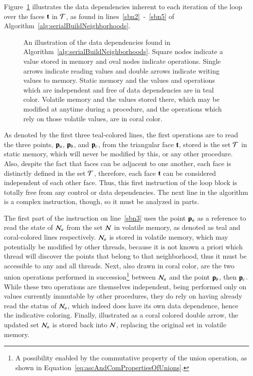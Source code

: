 Figure~\ref{fig:sabnDataDependencies} illustrates the data dependencies inherent to each iteration of the loop over the faces $\mathbf{t}$ in $\mathcal{T}$, as found in lines~\ref{sbn2}~-~\ref{sbn5} of Algorithm~\ref{alg:serialBuildNeighborhoods}.


\begin{figure}[ht]
	
	\caption[Data Dependencies in Serial Algorithm~\ref{alg:serialBuildNeighborhoods}: Build Neighborhoods]{An illustration of the data dependencies found in Algorithm~\ref{alg:serialBuildNeighborhoods}. Square nodes indicate a value stored in memory and oval nodes indicate operations. Single arrows indicate reading values and double arrows indicate writing values to memory. Static memory and the values and operations which are independent and free of data dependencies are in teal color. Volatile memory and the values stored there, which may be modified at anytime during a procedure, and the operations which rely on those volatile values, are in coral color.}
	\label{fig:sabnDataDependencies}
\end{figure}

As denoted by the first three teal-colored lines, the first operations are to read the three points, $\mathbf{p}_a$, $\mathbf{p}_b$, and $\mathbf{p}_c$, from the triangular face $\mathbf{t}$, stored is the set $\mathcal{T}$ in static memory, which will never be modified by this, or any other procedure. Also, despite the fact that faces can be adjacent to one another, each face is distinctly defined in the set $\mathcal{T}$, therefore, each face $\mathbf{t}$ can be considered independent of each other face. Thus, this first instruction of the loop block is totally free from any control or data dependencies. The next line in the algorithm is a complex instruction, though, so it must be analyzed in parts.

The first part of the instruction on line~\ref{sbn3} uses the point $\mathbf{p}_a$ as a reference to read the state of $\mathcal{N}_a$ from the set $\mathcal{N}$ in volatile memory, as denoted as teal and coral-colored lines respectively. $\mathcal{N}_a$ is stored in volatile memory, which may potentially be modified by other threads, because it is not known a priori which thread will discover the points that belong to that neighborhood, thus it must be accessible to any and all threads. Next, also drawn in coral color, are the two union operations performed in succession\footnote{A possibility enabled by the commutative property of the union operation, as shown in Equation~\ref{eq:ascAndComPropertiesOfUnions}.} between $\mathcal{N}_a$ and the point $\mathbf{p}_b$, then $\mathbf{p}_c$. While these two operations are themselves independent, being performed only on values currently immutable by other procedures, they do rely on having already read the status of $\mathcal{N}_a$, which indeed does have its own data dependence, hence the indicative coloring. Finally, illustrated as a coral colored double arrow, the updated set $\mathcal{N}_a$ is stored back into $\mathcal{N}$, replacing the original set in volatile memory.

